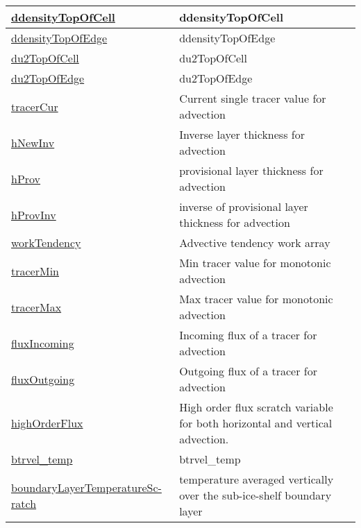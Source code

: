 {\begin{center}
\begin{longtable}{| p{2.0in} | p{4.0in} |}
    \hline
    \hyperref[subsec:var_sec_scratch_ddensityTopOfCell]{ddensityTopOfCell} & ddensityTopOfCell \\
    \hline
    \hyperref[subsec:var_sec_scratch_ddensityTopOfEdge]{ddensityTopOfEdge} & ddensityTopOfEdge \\
    \hline
    \hyperref[subsec:var_sec_scratch_du2TopOfCell]{du2TopOfCell} & du2TopOfCell \\
    \hline
    \hyperref[subsec:var_sec_scratch_du2TopOfEdge]{du2TopOfEdge} & du2TopOfEdge \\
    \hline
    \hyperref[subsec:var_sec_scratch_tracerCur]{tracerCur} & Current single tracer value for advection \\
    \hline
    \hyperref[subsec:var_sec_scratch_hNewInv]{hNewInv} & Inverse layer thickness for advection \\
    \hline
    \hyperref[subsec:var_sec_scratch_hProv]{hProv} & provisional layer thickness for advection \\
    \hline
    \hyperref[subsec:var_sec_scratch_hProvInv]{hProvInv} & inverse of provisional layer thickness for advection \\
    \hline
    \hyperref[subsec:var_sec_scratch_workTendency]{workTendency} & Advective tendency work array \\
    \hline
    \hyperref[subsec:var_sec_scratch_tracerMin]{tracerMin} & Min tracer value for monotonic advection \\
    \hline
    \hyperref[subsec:var_sec_scratch_tracerMax]{tracerMax} & Max tracer value for monotonic advection \\
    \hline
    \hyperref[subsec:var_sec_scratch_fluxIncoming]{fluxIncoming} & Incoming flux of a tracer for advection \\
    \hline
    \hyperref[subsec:var_sec_scratch_fluxOutgoing]{fluxOutgoing} & Outgoing flux of a tracer for advection \\
    \hline
    \hyperref[subsec:var_sec_scratch_highOrderFlux]{highOrderFlux} & High order flux scratch variable for both horizontal and vertical advection. \\
    \hline
    \hyperref[subsec:var_sec_scratch_btrvel_temp]{btrvel\_temp} & btrvel\_temp \\
    \hline
    \hyperref[subsec:var_sec_scratch_boundaryLayerTemperatureScratch]{boundaryLayerTemperatureSc-}\hyperref[subsec:var_sec_scratch_boundaryLayerTemperatureScratch]{ratch  }& temperature averaged vertically over the sub-ice-shelf boundary layer \\

\end{longtable}
\end{center}}
